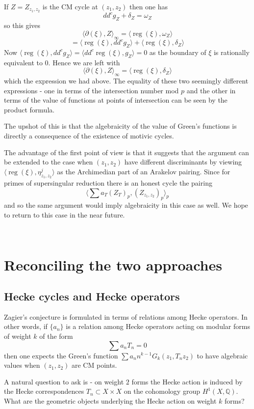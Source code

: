 \documentclass[11pt,a4paper]{article}
\newcommand {\Q}{{\mathds Q}}
\def\reg{\operatorname{reg}}
\begin{document}
If $Z=Z_{z_1,z_2}$ is the CM cycle at $(z_1,z_2)$ then one has 
%
$$dd^c g_Z+ \delta_Z=\omega_Z$$ 
%
so this gives
%
$$\langle \partial(\xi),Z \rangle_{\infty}= \langle \reg (\xi),\omega_Z \rangle $$
$$=\langle \reg(\xi),dd^c g_Z \rangle + \langle \reg(\xi),\delta_Z \rangle$$
%
Now $ \langle \reg(\xi),dd^c g_Z \rangle = \langle dd^c \reg(\xi),g_Z \rangle = 0$ as the boundary of $\xi$ is rationally equivalent to $0$. Hence we are left with 
%
$$\langle \partial(\xi),Z \rangle_{\infty}= \langle \reg(\xi),\delta_Z \rangle $$
%
which the expression we had above. The equality of these two seemingly different expressions - one in terms of the intersection number mod $p$ and the other in terms of the value of functions at points of intersection  can be seen by the product formula. 

The upshot of this is that the algebraicity of the value of Green's functions is directly a consequence of the existence of motivic cycles. 

The advantage of the first point of view is that it suggests that the argument can be extended to the case when $(z_1,z_2)$ have different discriminants by viewing $\langle \reg(\xi),\eta^j_{z_1,z_2}\rangle$ as the Archimedian part of an Arakelov pairing. Since for primes of supersingular reduction there is an honest cycle the pairing 
%
$$\langle \sum a_T (Z_T)_p,(Z_{z_1,z_2})_p \rangle_p$$
%
and so the same argument would imply algebraicity in this case as well. We hope to return to this case in the near future. 




\
\section{Reconciling the two approaches}

\subsection{Hecke cycles and Hecke operators}

Zagier's conjecture is formulated in terms of relations among Hecke operators. In other words, if $\{a_n\}$ is a relation among Hecke operators acting on modular forms of weight $k$ of the form 
%
$$\sum a_n T_n=0$$
%
then one expects the Green's function $\sum a_n n^{k-1}G_k(z_1,T_n z_2)$ to have algebraic values when $(z_1,z_2)$ are CM points. 

A natural question to ask is - on weight $2$ forms the Hecke action is induced by the Hecke correspondences $T_n \subset X \times X$ on the cohomology group $H^1(X,\Q)$. What  are the  geometric objects underlying the Hecke action on weight $k$ forms? 
\end{document}
